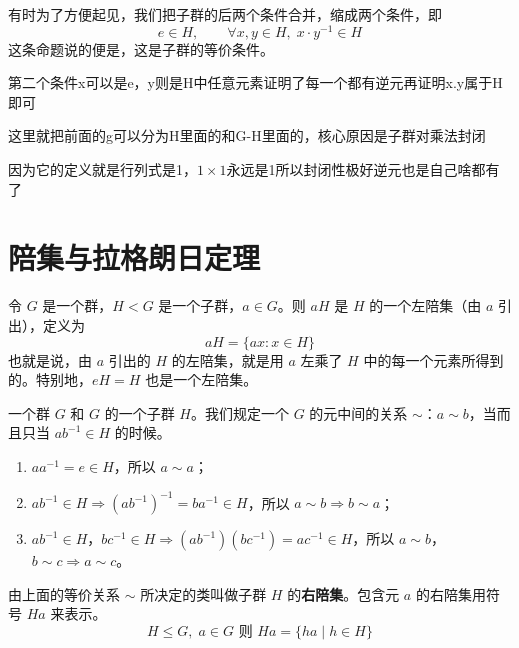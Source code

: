 \begin{proposition}[命题 1.11]
有时为了方便起见，我们把子群的后两个条件合并，缩成两个条件，即
\[
e\in H,\qquad\forall x,y\in H,\;x\cdot y^{-1}\in H
\]
这条命题说的便是，这是子群的等价条件。
\end{proposition}

\begin{note}[命题1 11证明]
第二个条件x可以是e，y则是H中任意元素证明了每一个都有逆元再证明x.y属于H即可
\end{note}

\begin{note}[子群里面的元素当陪集的x，则这个陪集还是原来子群xH=H]
这里就把前面的g可以分为H里面的和G-H里面的，核心原因是子群对乘法封闭
\end{note}

\begin{note}[命题1 12特殊线性群是群]
因为它的定义就是行列式是1，$1\times1$永远是1所以封闭性极好逆元也是自己啥都有了
\end{note}

\section{陪集与拉格朗日定理}

\begin{definition}[左陪集（定义 1.27）]
令 $G$ 是一个群，$H<G$ 是一个子群，$a\in G$。则 $aH$ 是 $H$ 的一个左陪集（由 $a$ 引出），定义为
\[
aH=\{ax:x\in H\}
\]
也就是说，由 $a$ 引出的 $H$ 的左陪集，就是用 $a$ 左乘了 $H$ 中的每一个元素所得到的。特别地，$eH=H$ 也是一个左陪集。
\end{definition}

\begin{definition}[右陪集]
一个群 $G$ 和 $G$ 的一个子群 $H$。我们规定一个 $G$ 的元中间的关系 $\sim$：$a\sim b$，当而且只当 $ab^{-1}\in H$ 的时候。
\begin{enumerate}
  \item $aa^{-1}=e\in H$，所以 $a\sim a$；
  \item $ab^{-1}\in H\Rightarrow(ab^{-1})^{-1}=ba^{-1}\in H$，所以 $a\sim b\Rightarrow b\sim a$；
  \item $ab^{-1}\in H$，$bc^{-1}\in H\Rightarrow(ab^{-1})(bc^{-1})=ac^{-1}\in H$，所以 $a\sim b$，$b\sim c\Rightarrow a\sim c$。
\end{enumerate}
由上面的等价关系 $\sim$ 所决定的类叫做子群 $H$ 的\textbf{右陪集}。包含元 $a$ 的右陪集用符号 $Ha$ 来表示。
\[
H\le G,\;a\in G\text{ 则 }Ha=\{ha\mid h\in H\}
\]
\end{definition}


